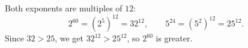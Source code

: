 Both exponents are multiples of $12$:
\[2^{60}=\left(2^5\right)^{12}=32^{12},\qquad5^{24}=\left(5^2\right)^{12}=25^{12}.\]
Since $32>25$, we get $32^{12}>25^{12}$, so $\boxed{2^{60}}$ is greater.
